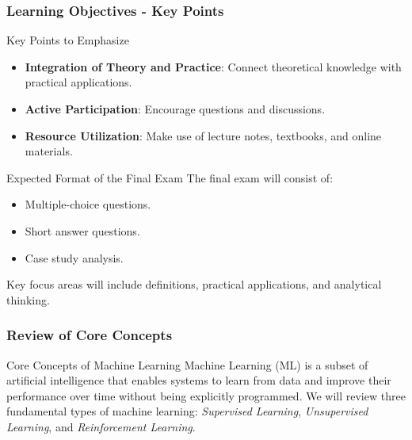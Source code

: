 \documentclass{beamer}
\begin{document}
\begin{frame}[fragile]
    \frametitle{Learning Objectives - Key Points}
    \begin{block}{Key Points to Emphasize}
        \begin{itemize}
            \item \textbf{Integration of Theory and Practice}: Connect theoretical knowledge with practical applications.
            \item \textbf{Active Participation}: Encourage questions and discussions.
            \item \textbf{Resource Utilization}: Make use of lecture notes, textbooks, and online materials.
        \end{itemize}
    \end{block}

    \begin{block}{Expected Format of the Final Exam}
        The final exam will consist of:
        \begin{itemize}
            \item Multiple-choice questions.
            \item Short answer questions.
            \item Case study analysis.
        \end{itemize}
        Key focus areas will include definitions, practical applications, and analytical thinking.
    \end{block}
\end{frame}

\begin{frame}[fragile]
    \frametitle{Review of Core Concepts}
    \begin{block}{Core Concepts of Machine Learning}
        Machine Learning (ML) is a subset of artificial intelligence that enables systems to learn from data and improve their performance over time without being explicitly programmed. 
        We will review three fundamental types of machine learning: \textit{Supervised Learning}, \textit{Unsupervised Learning}, and \textit{Reinforcement Learning}.
    \end{block}
\end{frame}
\end{document}
